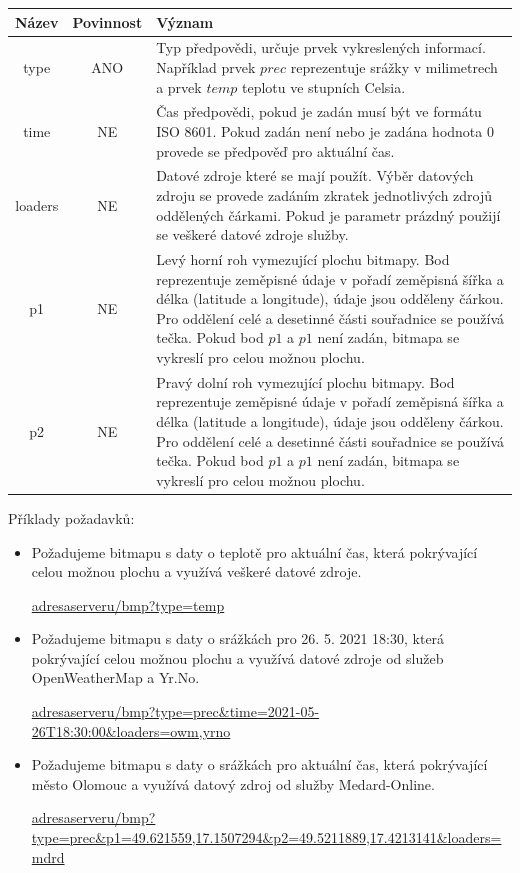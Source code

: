 \documentclass[czech,bachelor,dept460,male,csharp,cpdeclaration]{diploma}
\begin{document}
	\begin{center}
		
		
		\begin{tabular}{c c p{13cm}}
			Název & Povinnost & Význam \\
			\midrule
			type & ANO & Typ předpovědi, určuje prvek vykreslených informací. Například prvek $prec$ reprezentuje srážky v milimetrech a prvek $temp$ teplotu ve stupních Celsia.\\ 
			time & NE & Čas předpovědi, pokud je zadán musí být ve formátu ISO 8601. Pokud zadán není nebo je zadána hodnota 0  provede se předpověď pro aktuální čas.\\ 
			loaders & NE & Datové zdroje které se mají použít. Výběr datových zdroju se provede zadáním zkratek jednotlivých zdrojů oddělených čárkami. Pokud je parametr prázdný použijí se veškeré datové zdroje služby. \\ 
			p1 & NE & Levý horní roh vymezující plochu bitmapy. Bod reprezentuje zeměpisné údaje v pořadí zeměpisná šířka a délka (latitude a longitude), údaje jsou odděleny čárkou. Pro oddělení celé a desetinné části souřadnice se používá tečka. Pokud bod $p1$ a $p1$ není zadán, bitmapa se vykreslí pro celou možnou plochu.\\
			p2 & NE & Pravý dolní roh vymezující plochu bitmapy. Bod reprezentuje zeměpisné údaje v pořadí zeměpisná šířka a délka (latitude a longitude), údaje jsou odděleny čárkou. Pro oddělení celé a desetinné části souřadnice se používá tečka. Pokud bod $p1$ a $p1$ není zadán, bitmapa se vykreslí pro celou možnou plochu.\\
		\end{tabular}
	\end{center}
	
	Příklady požadavků:
	\begin{itemize}
		\item Požadujeme bitmapu s daty o teplotě pro aktuální čas, která pokrývající celou možnou plochu a využívá veškeré datové zdroje.
		
		\url{adresaserveru/bmp?type=temp}
		
		\item Požadujeme bitmapu s daty o srážkách pro 26. 5. 2021 18:30, která pokrývající celou možnou plochu a využívá datové zdroje od služeb OpenWeatherMap a Yr.No.
		
		\url{adresaserveru/bmp?type=prec\&time=2021-05-26T18:30:00\&loaders=owm,yrno}
		
		\item Požadujeme bitmapu s daty o srážkách pro aktuální čas, která pokrývající město Olomouc a využívá datový zdroj od služby Medard-Online.
		
		\url{adresaserveru/bmp?type=prec\&p1=49.621559,17.1507294\&p2=49.5211889,17.4213141\&loaders=mdrd}
	\end{itemize}
	
\end{document}
